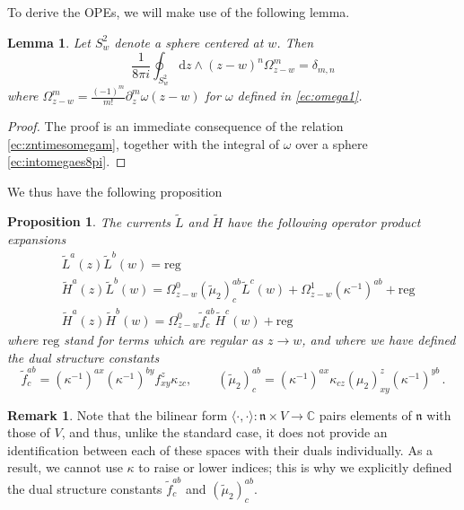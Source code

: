 \documentclass[11pt]{amsart}
\newcommand{\tL}{{\tilde L}}
\newcommand{\tH}{{\tilde H}}
\numberwithin{equation}{section}
\numberwithin{figure}{section}
\numberwithin{table}{section}
\renewcommand{\d}{\mathrm{d}}
\theoremstyle{thm}
\newtheorem{prop}[theorem]{Proposition}
\newtheorem{lemma}[theorem]{Lemma}
\numberwithin{equation}{subsection}
\theoremstyle{definition}
\theoremstyle{rem}
\newtheorem{remark}{Remark}
\begin{document}
To derive the OPEs, we will make use of the following lemma.
\begin{lemma}
    Let $S_{w}^2$ denote a sphere centered at $w$. Then
    \begin{equation}
    \label{ec:gencauchyform}
        \frac{1}{8\pi i}\oint_{S_{w}^2}\d z \wedge (z-w)^n\Omega_{z-w}^m = \delta_{m,n}
    \end{equation}
where $\Omega_{z-w}^m = \frac{(-1)^m}{m!} \partial_z^m \omega(z-w)$ for $\omega$ defined in \eqref{ec:omega1}.
\end{lemma}

\begin{proof}
   The proof is an immediate consequence of the relation \eqref{ec:zntimesomegam}, together with the integral of $\omega$ over a sphere \eqref{ec:intomegaes8pi}.  
\end{proof}





We thus have the following proposition
\begin{prop}
\label{thm:opes}
    The currents $\tL$ and $\tH$ have the following operator product expansions
    \begin{align}
        & \tL^a(z)\tL^b(w) = \mathrm{reg}
        \label{ec:LLOPE}\\
        & \tH^a(z)\tL^b(w) = \Omega_{z-w}^0 (\tilde \mu_2)^{ab}_c \tL^c(w) + \Omega_{z-w}^1(\kappa^{-1})^{ab}+\mathrm{reg} \label{ec:HLOPE} \\
        &\tH^a(z)\tH^b(w) = \Omega_{z-w}^0 \tilde f^{ab}_c \tH^c(w) + \mathrm{reg}
        \label{ec:HHOPE}
    \end{align}
where $\mathrm{reg}$ stand for terms which are regular as $z \to w$, and where we have defined the dual structure constants
\begin{equation}
        \tilde f^{ab}_c = (\kappa^{-1})^{ax}(\kappa^{-1})^{by}f_{xy}^z\kappa_{zc},\qquad  (\tilde\mu_2)^{ab}_c = (\kappa^{-1})^{ax}\kappa_{cz}(\mu_2)_{xy}^z(\kappa^{-1})^{yb} \,.\label{dualbrackets}
    \end{equation}    
\end{prop}
\begin{remark}
Note that the bilinear form \(\langle \cdot,\cdot \rangle : \mathfrak{n} \times V \to \mathbb{C}\) pairs elements of \(\mathfrak{n}\) with those of \(V\), and thus, unlike the standard case, it does not provide an identification between each of these spaces with their duals individually. As a result, we cannot use \(\kappa\) to raise or lower indices; this is why we explicitly defined the dual structure constants $\tilde f^{ab}_c$ and $(\tilde{\mu}_2)_c^{ab}$. 
\end{remark}
\end{document}
